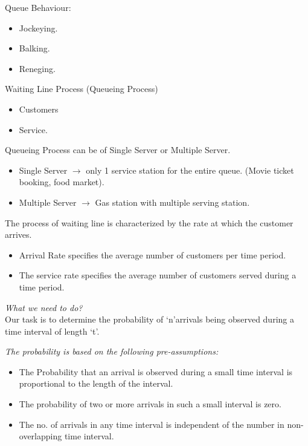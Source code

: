 \documentclass[12pt, letterpaper]{article}
\begin{document}
Queue Behaviour:
\begin{itemize}
    \item Jockeying.
    \item Balking.
    \item Reneging.
\end{itemize}

Waiting Line Process (Queueing Process)
\begin{itemize}
    \item Customers
    \item Service.
\end{itemize}

Queueing Process can be of Single Server or Multiple Server.
\begin{itemize}
    \item Single Server $\rightarrow$ only 1 service station for the entire queue. (Movie ticket booking, food market).
    \item Multiple Server $\rightarrow$ Gas station with multiple serving station.
\end{itemize}

The process of waiting line is characterized by the rate at which the customer arrives. 

\begin{itemize}
    \item Arrival Rate specifies the average number of customers per time period.
    \item The service rate specifies the average number of customers served during a time period.
\end{itemize}

\emph{What we need to do?} \\
Our task is to determine the probability of ‘n’arrivals being observed during a time interval of length ‘t’.

\emph{The probability is based on the following pre-assumptions:}
\begin{itemize}
    \item The Probability that an arrival is observed during a small time interval is proportional to the length of the interval.

    \item The probability of two or more arrivals in such a small interval is zero.

    \item The no. of arrivals in any time interval is independent of the number in non-overlapping time interval.
\end{itemize}
\end{document}

